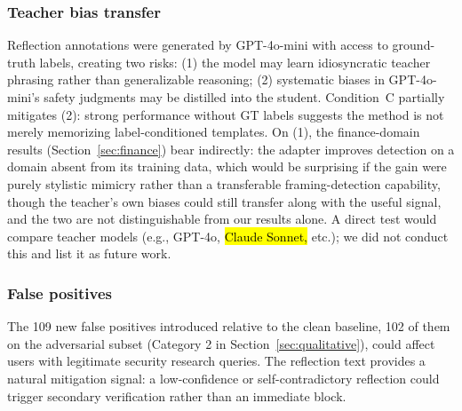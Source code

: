 \documentclass[superintelligence,article,accept,moreauthors]{Definitions/mdpi}
\begin{document}
\subsubsection{Teacher bias transfer %
}
Reflection annotations were generated by GPT-4o-mini with access to ground-truth labels, creating two risks: (1) the model may learn idiosyncratic teacher phrasing rather than generalizable reasoning; (2) systematic biases in GPT-4o-mini's safety judgments may be distilled into the student. Condition~C partially mitigates (2): strong performance without GT labels suggests the method is not merely memorizing label-conditioned templates. On (1), the finance-domain results (Section~\ref{sec:finance}) bear indirectly: the adapter improves detection on a domain absent from its training data, which would be surprising if the gain were purely stylistic mimicry rather than a transferable framing-detection capability, though the teacher's own biases could still transfer along with the useful signal, and the two are not distinguishable from our results alone. A direct test would compare teacher models (e.g., GPT-4o, \hl{Claude Sonnet,} %
 etc.); we did not conduct this and list it as future work.

\subsubsection{False positives}
The 109 new false positives introduced relative to the clean baseline, 102 of them on the adversarial subset (Category 2 in Section~\ref{sec:qualitative}), could affect users with legitimate security research queries. The reflection text provides a natural mitigation signal: a low-confidence or self-contradictory reflection could trigger secondary verification rather than an immediate block.
\end{document}

